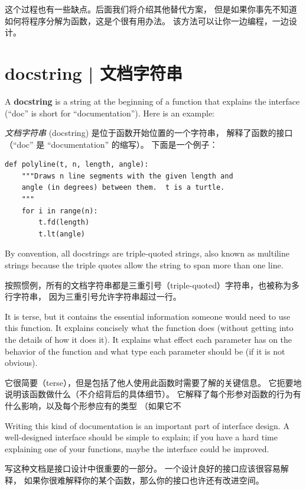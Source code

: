 这个过程也有一些缺点。后面我们将介绍其他替代方案，
但是如果你事先不知道如何将程序分解为函数，这是个很有用办法。
该方法可以让你一边编程，一边设计。


\section{docstring  |  文档字符串}
\label{docstring}

A {\bf docstring} is a string at the beginning of a function that
explains the interface (``doc'' is short for ``documentation'').  Here
is an example:

\emph{文档字符串} (docstring) 是位于函数开始位置的一个字符串，
解释了函数的接口（``doc'' 是 ``documentation'' 的缩写）。 下面是一个例子：

\begin{lstlisting}
def polyline(t, n, length, angle):
    """Draws n line segments with the given length and
    angle (in degrees) between them.  t is a turtle.
    """
    for i in range(n):
        t.fd(length)
        t.lt(angle)
\end{lstlisting}

%
By convention, all docstrings are triple-quoted strings, also known
as multiline strings because the triple quotes allow the string
to span more than one line.

按照惯例，所有的文档字符串都是三重引号（triple-quoted）字符串，也被称为多行字符串，
因为三重引号允许字符串超过一行。
  
  

It is terse, but it contains the essential information
someone would need to use this function.  It explains concisely what
the function does (without getting into the details of how it does
it).  It explains what effect each parameter has on the behavior of
the function and what type each parameter should be (if it is not
obvious).

它很简要（terse），但是包括了他人使用此函数时需要了解的关键信息。
它扼要地说明该函数做什么（不介绍背后的具体细节）。
它解释了每个形参对函数的行为有什么影响，以及每个形参应有的类型
（如果它不

Writing this kind of documentation is an important part of interface
design.  A well-designed interface should be simple to explain;
if you have a hard time explaining one of your functions,
maybe the interface could be improved.

写这种文档是接口设计中很重要的一部分。 一个设计良好的接口应该很容易解释，
如果你很难解释你的某个函数，那么你的接口也许还有改进空间。


